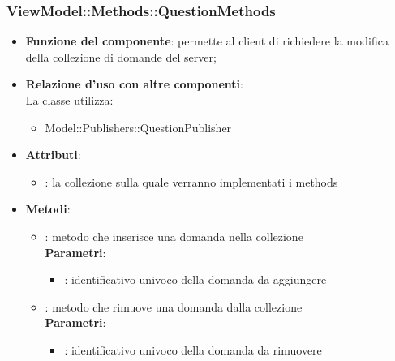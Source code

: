 \subsubsection{ViewModel::Methods::QuestionMethods}
\begin{itemize}
\item\textbf{Funzione del componente}: permette al client di richiedere la modifica della collezione di domande del server;
	\item\textbf{Relazione d'uso con altre componenti}: \\
La classe utilizza:
	\begin{itemize}
		\item Model::Publishers::QuestionPublisher
	\end{itemize}
\item\textbf{Attributi}:
	\begin{itemize}
		\item{}: la collezione sulla quale verranno implementati i methods\\
	\end{itemize}
\item\textbf{Metodi}:
	\begin{itemize}
		\item{}: metodo che inserisce una domanda nella collezione\\
		\textbf{Parametri}:
			\begin{itemize}
				\item{}: identificativo univoco della domanda da aggiungere\\
			\end{itemize}
		\item{}: metodo che rimuove una domanda dalla collezione\\
		\textbf{Parametri}:
			\begin{itemize}
				\item{}: identificativo univoco della domanda da rimuovere\\
			\end{itemize}
	\end{itemize}
\end{itemize}

